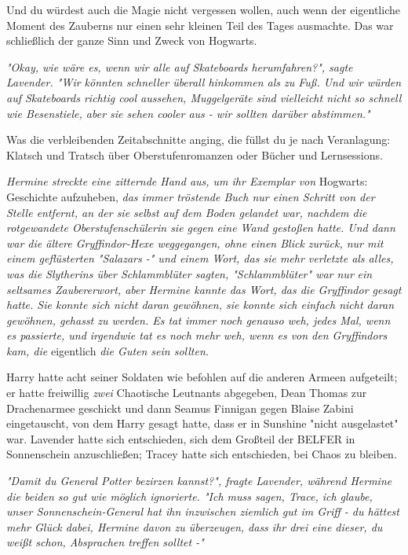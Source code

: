{Und du würdest auch die Magie nicht vergessen wollen, auch wenn der eigentliche Moment des Zauberns nur einen sehr kleinen Teil des Tages ausmachte. Das war schließlich der ganze Sinn und Zweck von Hogwarts.

\emph{"Okay, wie wäre es, wenn wir alle auf Skateboards herumfahren?", sagte Lavender. "Wir könnten schneller überall hinkommen als zu Fuß. Und wir würden auf Skateboards richtig cool aussehen, Muggelgeräte sind vielleicht nicht so schnell wie Besenstiele, aber sie sehen cooler aus - wir sollten darüber abstimmen."}

Was die verbleibenden Zeitabschnitte anging, die füllst du je nach Veranlagung: Klatsch und Tratsch über Oberstufenromanzen oder Bücher und Lernsessions.

\emph{Hermine streckte eine zitternde Hand aus, um ihr Exemplar von} Hogwarts: Geschichte aufzuheben, \emph{das immer tröstende Buch nur einen Schritt von der Stelle entfernt, an der sie selbst auf dem Boden gelandet war, nachdem die rotgewandete Oberstufenschülerin sie gegen eine Wand gestoßen hatte. Und dann war die ältere Gryffindor-Hexe weggegangen, ohne einen Blick zurück, nur mit einem geflüsterten "Salazars -" und einem Wort, das sie mehr verletzte als alles, was die Slytherins über Schlammblüter sagten, "Schlammblüter" war nur} \emph{ein seltsames Zaubererwort, aber Hermine kannte das Wort, das die Gryffindor gesagt hatte. Sie konnte sich nicht daran gewöhnen, sie konnte sich einfach nicht daran gewöhnen, gehasst zu werden. Es tat immer noch genauso weh, jedes Mal, wenn es passierte, und irgendwie tat es noch mehr weh, wenn es von den Gryffindors kam, die} eigentlich \emph{die Guten sein sollten.}

Harry hatte acht seiner Soldaten wie befohlen auf die anderen Armeen aufgeteilt; er hatte freiwillig \emph{zwei} Chaotische Leutnants abgegeben, Dean Thomas zur Drachenarmee geschickt und dann Seamus Finnigan gegen Blaise Zabini eingetauscht, von dem Harry gesagt hatte, dass er in Sunshine "nicht ausgelastet" war. Lavender hatte sich entschieden, sich dem Großteil der BELFER in Sonnenschein anzuschließen; Tracey hatte sich entschieden, bei Chaos zu bleiben.

\emph{"Damit du General Potter bezirzen kannst?", fragte Lavender, während Hermine die beiden so gut wie möglich ignorierte. "Ich muss sagen, Trace, ich glaube, unser Sonnenschein-General hat ihn inzwischen ziemlich gut im Griff - du hättest mehr Glück dabei, Hermine davon zu überzeugen, dass ihr drei eine dieser, du weißt schon, Absprachen treffen solltet -"}

}
